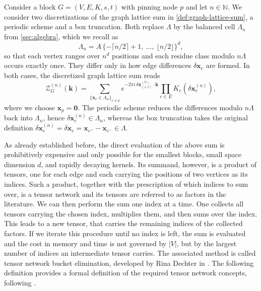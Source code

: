 \documentclass[]{amsart}
\numberwithin{mythm}{section}
\begin{document}
\begin{definition}
\label{def:discretized}
Consider a block $G=(V,E,K,s,t)$ with pinning node $p$ and let $n\in\mathds N$. We consider two discretizations of the graph lattice sum in \cref{def:graph-lattice-sum}, a periodic scheme and a box truncation. Both replace $\Lambda$ by the balanced cell $\Lambda_n$ from \cref{sec:algebra}, which we recall as
\[
\Lambda_n=A\,\{-\lceil n/2\rceil+1,\ \dots,\ \lfloor n/2\rfloor\}^d,
\]
so that each vertex ranges over $n^d$ positions and each residue class modulo $n\Lambda$ occurs exactly once. They differ only in how edge differences $\delta \bm x_e$ are formed. In both cases, the discretized graph lattice sum reads \[
\mathcal Z^{(n)}_{G}(\bm k)=\sum_{\{\bm x_v\in \Lambda_n\}_{v\neq p}}
e^{-2\pi i\,\delta\bm x^{(n)}_{(s,t)}\cdot\bm k}\prod_{e\in E}K_e(\delta\bm x^{(n)}_e),
\]
where we choose $\bm x_p=\bm 0$. The periodic scheme reduces the differences modulo $n\Lambda$ back into $\Lambda_n$, hence $\delta \bm x_e^{(n)}\in \Lambda_n$, whereas the box truncation takes the original definition $\delta \bm x^{(n)}_e=\delta\bm x_e=\bm x_{e^+}-\bm x_{e^-}\in\Lambda$.
\end{definition}
As already established before, the direct evaluation of the above sum is prohibitively expensive and only possible for the smallest blocks, small space dimension $d$, and rapidly decaying kernels. Its summand, however, is a product of tensors, one for each edge and each carrying the positions of two vertices as its indices. Such a product, together with the prescription of which indices to sum over, is a tensor network and its tensors are referred to as factors in the literature. We can then perform the sum one index at a time. One collects all tensors carrying the chosen index, multiplies them, and then sums over the index. This leads to a new tensor, that carries the remaining indices of the collected factors. If we iterate this procedure until no index is left, the sum is evaluated and the cost in memory and time is not governed by $\vert V\vert$, but by the largest number of indices an intermediate tensor carries. The associated method is called tensor network bucket elimination, developed by Rina Dechter in \cite{Dechter1999}. The
following definition provides a formal definition of the required tensor network concepts, following \cite{Dechter1999,kschischang2001factor,koller2009probabilistic}.
\end{document}
